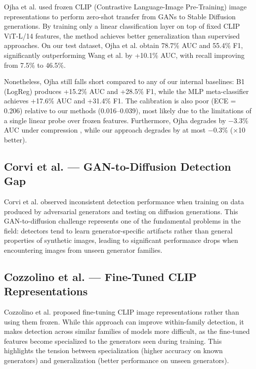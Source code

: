 Ojha et al. \cite{ojha2023towards} used frozen CLIP (Contrastive Language-Image Pre-Training) image representations to perform zero-shot transfer from GANs to Stable Diffusion generations. By training only a linear classification layer on top of fixed CLIP ViT-L/14 features, the method achieves better generalization than supervised approaches. On our test dataset, Ojha et al. obtain 78.7\% AUC and 55.4\% F1, significantly outperforming Wang et al. by +10.1\% AUC, with recall improving from 7.5\% to 46.5\%.

Nonetheless, Ojha still falls short compared to any of our internal baselines: B1 (LogReg) produces +15.2\% AUC and +28.5\% F1, while the MLP meta-classifier achieves +17.6\% AUC and +31.4\% F1. The calibration is also poor (ECE = 0.206) relative to our methods (0.016--0.039), most likely due to the limitations of a single linear probe over frozen features. Furthermore, Ojha degrades by $-$3.3\% AUC under compression \cite{ojha2023towards}, while our approach degrades by at most $-$0.3\% ($\times$10 better).


\subsection{Corvi et al. --- GAN-to-Diffusion Detection Gap}\label{sec:corvi}

Corvi et al. \cite{corvi2023detection} observed inconsistent detection performance when training on data produced by adversarial generators and testing on diffusion generations. This GAN-to-diffusion challenge represents one of the fundamental problems in the field: detectors tend to learn generator-specific artifacts rather than general properties of synthetic images, leading to significant performance drops when encountering images from unseen generator families.


\subsection{Cozzolino et al. --- Fine-Tuned CLIP Representations}\label{sec:cozzolino}

Cozzolino et al. \cite{cozzolino2024raising} proposed fine-tuning CLIP image representations rather than using them frozen. While this approach can improve within-family detection, it makes detection across similar families of models more difficult, as the fine-tuned features become specialized to the generators seen during training. This highlights the tension between specialization (higher accuracy on known generators) and generalization (better performance on unseen generators).


